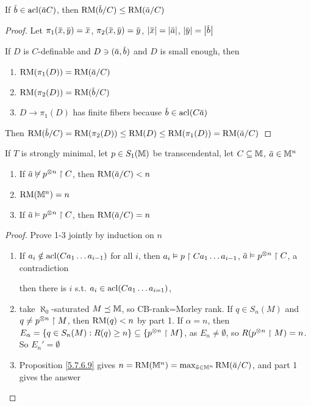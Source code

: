 \documentclass[11pt]{article}
\begin{document}
\begin{lemma}[]
If \(\barb\in\acl(\bara C)\), then \(\RM(\barb/C)\le\RM(\bara/C)\)
\end{lemma}

\begin{proof}
Let
\(\pi_1(\barx,\bary)=\barx\),
\(\pi_2(\barx,\bary)=\bary\), \(\abs{\barx}=\abs{\bara}\), \(\abs{\bary}=\abs{\barb}\)

If \(D\) is \(C\)-definable and \(D\ni(\bara,\barb)\) and \(D\) is small enough, then
\begin{enumerate}
\item \(\RM(\pi_1(D))=\RM(\bara/C)\)
\item \(\RM(\pi_2(D))=\RM(\barb/C)\)
\item \(D\to\pi_1(D)\) has finite fibers because \(\barb\in\acl(C\bara)\)
\end{enumerate}


Then \(\RM(\barb/C)=\RM(\pi_2(D))\le\RM(D)\le\RM(\pi_1(D))=\RM(\bara/C)\)
\end{proof}

\begin{theorem}[]
If \(T\) is strongly minimal, let \(p\in S_1(\mathbb{M})\) be transcendental, let \(C\subseteq\mathbb{M}\), \(\bara\in\M^n\)
\begin{enumerate}
\item If \(\bara\not\vDash p^{\otimes n}\uhr C\), then \(\RM(\bara/C)<n\)
\item \(\operatorname{RM}(\mathbb{M}^n)=n\)
\item If \(\bara\vDash p^{\otimes n}\uhr C\), then \(\RM(\bara/C)=n\)
\end{enumerate}
\end{theorem}

\begin{proof}
Prove 1-3 jointly by induction on \(n\)
\begin{enumerate}
\item If \(a_i\notin\operatorname{acl}(Ca_1\dots a_{i-1})\) for all \(i\),
then \(a_i\vDash p\upharpoonright Ca_1\dots a_{i-1}\), \(\bara\vDash p^{\otimes n}\uhr C\), a contradiction

then there is \(i\) s.t. \(a_i\in\operatorname{acl}(Ca_1\dots a_{i=1})\),
\item take \(\aleph_0\)-saturated \(M\preceq\mathbb{M}\), so CB-rank=Morley rank. If \(q\in S_n(M)\)
and \(q\neq p^{\otimes n}\upharpoonright M\), then \(\operatorname{RM}(q)<n\) by part 1. If \(\alpha=n\), then
\(E_\alpha=\{q\in S_n(M):R(q)\ge n\}\subseteq\{p^{\otimes n}\upharpoonright M\}\), as \(E_n\neq\emptyset\), so \(R(p^{\otimes n}\upharpoonright M)=n\). So \(E_n'=\emptyset\)
\item Proposition \ref{5.7.6.9} gives \(n=\RM(\M^n)=\max_{\bara\in\M^n}\RM(\bara/C)\), and part 1 gives the answer
\end{enumerate}
\end{proof}
\end{document}
